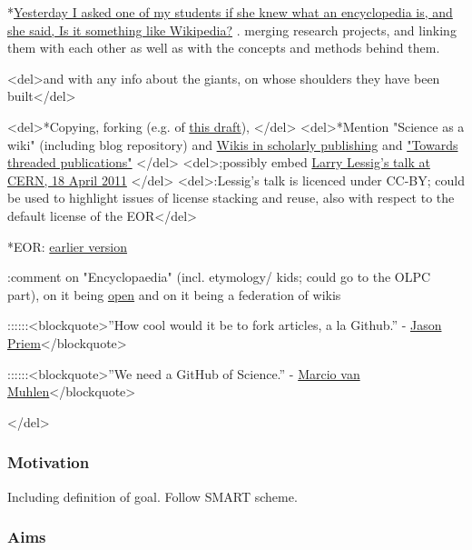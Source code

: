 \documentclass[final,authoryear,3p]{elsarticle-open-drafting}
\begin{document}
\begin{enumerate}
*\href{http://twitter.com/#!/egonwillighagen/statuses/39097468700336128}{Yesterday I asked one of my students if she knew what an encyclopedia is, and she said, Is it something like Wikipedia?}
. merging research projects, and linking them with each other as well as with the concepts and methods behind them.

<del>and with any info about the giants, on whose shoulders they have been built</del>

<del>*Copying, forking (e.g. of \href{http://species-id.net/w/index.php?title=Draft:Encyclopaedia_of_original_research&diff=prev&oldid=5076}{this draft}), </del>
<del>*Mention "Science as a wiki" (including blog repository) and \href{http://species-id.net/wiki/Wikis_in_scholarly_publishing}{Wikis in scholarly publishing} and \href{http://friendfeed.com/cameronneylon/c476db70/imo-this-is-possibly-single-most-useful-thing-we}{"Towards threaded publications"} </del>
<del>;possibly embed \href{http://vimeo.com/22633948}{Larry Lessig's talk at CERN, 18 April 2011} </del>
<del>:Lessig's talk is licenced under CC-BY; could be used to highlight issues of license stacking and reuse, also with respect to the default license of the EOR</del>

*EOR: \href{http://www.science3point0.com/coaspedia/index.php/Proposals:Wikimedia_Deutschland/2010/Wissenswert/Wissenschaft_als_Wiki/English}{earlier version}


:comment on "Encyclopaedia" (incl. etymology/ kids; could go to the OLPC part), on it being \href{http://www.opendefinition.org/}{open} and on it being a federation of wikis


::::::<blockquote>''How cool would it be to fork articles, a la Github.'' - \href{http://friendfeed.com/cameronneylon/c476db70/imo-this-is-possibly-single-most-useful-thing-we}{Jason Priem}</blockquote>

::::::<blockquote>''We need a GitHub of Science.'' - \href{http://marciovm.com/i-want-a-github-of-science}{Marcio van Muhlen}</blockquote>

</del>
\subsubsection{Motivation}
Including definition of goal. Follow SMART scheme.

\subsubsection{Aims}


\end{enumerate}
\end{document}
